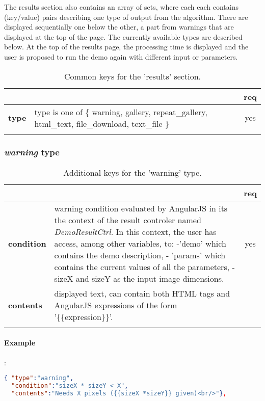 The results section also contains an array of sets, where each each contains 
(key/value) pairs describing one type of output from the algorithm. There are 
displayed sequentially one below the other, a part from warnings that are 
displayed at the top of the page. The currently available types are described 
below. At the top of the results page, the processing time is displayed and the 
user is proposed to run the demo again with different input or parameters.

\begin{longtable}{|>{\bf}L{\linewidth}|L{\linewidth}|c|}
\hline
      &  & {\bf req} 
\tabularnewline \hline \hline
 type      & type is one of \{  warning, gallery, repeat\_gallery, html\_text, 
                                file\_download, text\_file \}  & yes \\ \hline
\caption{Common keys for the 'results' section.}
\end{longtable}


\subsubsection{ \emph{warning} type}

\begin{longtable}{|>{\bf}L{\linewidth}|L{\linewidth}|c|}
\hline
      &  & {\bf req} 
\tabularnewline \hline \hline
 condition & warning condition evaluated by AngularJS in its 
the context of the result controler named {\em DemoResultCtrl}. In this 
context, the user has access, among other variables, to: -'demo' which 
contains the demo description, - 'params' which contains the current 
values of all the parameters, - sizeX and sizeY as the input image dimensions.  
& yes \\ \hline
 contents  & displayed text, can contain both HTML tags and AngularJS 
expressions of the form '\{\{expression\}\}'. & \\ \hline
\caption{Additional keys for the 'warning' type.}
\end{longtable}

\paragraph{Example}:\\

\begin{lstlisting}[language=json,firstnumber=1]
{ "type":"warning", 
  "condition":"sizeX * sizeY < X",
  "contents":"Needs X pixels ({{sizeX *sizeY}} given)<br/>"},
\end{lstlisting}

